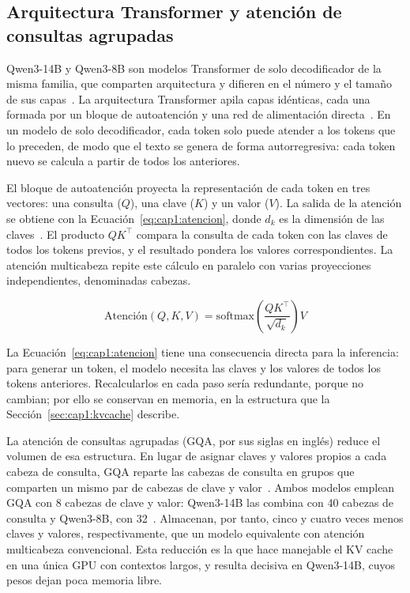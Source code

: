 \subsection{Arquitectura Transformer y atención de consultas agrupadas}
\label{sec:cap1:transformer}

Qwen3-14B y Qwen3-8B son modelos Transformer de solo decodificador de la misma familia, que comparten arquitectura y difieren en el número y el tamaño de sus capas~\cite{qwen2025qwen3}. La arquitectura Transformer apila capas idénticas, cada una formada por un bloque de autoatención y una red de alimentación directa~\cite{vaswani2017attention}. En un modelo de solo decodificador, cada token solo puede atender a los tokens que lo preceden, de modo que el texto se genera de forma autorregresiva: cada token nuevo se calcula a partir de todos los anteriores.

El bloque de autoatención proyecta la representación de cada token en tres vectores: una consulta ($Q$), una clave ($K$) y un valor ($V$). La salida de la atención se obtiene con la Ecuación~\ref{eq:cap1:atencion}, donde $d_k$ es la dimensión de las claves~\cite{vaswani2017attention}. El producto $QK^{\top}$ compara la consulta de cada token con las claves de todos los tokens previos, y el resultado pondera los valores correspondientes. La atención multicabeza repite este cálculo en paralelo con varias proyecciones independientes, denominadas cabezas.

\begin{equation}
\label{eq:cap1:atencion}
\mbox{Atención}(Q, K, V) = \mathrm{softmax}\!\left(\frac{QK^{\top}}{\sqrt{d_k}}\right) V
\end{equation}

La Ecuación~\ref{eq:cap1:atencion} tiene una consecuencia directa para la inferencia: para generar un token, el modelo necesita las claves y los valores de todos los tokens anteriores. Recalcularlos en cada paso sería redundante, porque no cambian; por ello se conservan en memoria, en la estructura que la Sección~\ref{sec:cap1:kvcache} describe.

La atención de consultas agrupadas (GQA, por sus siglas en inglés) reduce el volumen de esa estructura. En lugar de asignar claves y valores propios a cada cabeza de consulta, GQA reparte las cabezas de consulta en grupos que comparten un mismo par de cabezas de clave y valor~\cite{ainslie2023gqa}. Ambos modelos emplean GQA con 8 cabezas de clave y valor: Qwen3-14B las combina con 40 cabezas de consulta y Qwen3-8B, con 32~\cite{qwen2025qwen3}. Almacenan, por tanto, cinco y cuatro veces menos claves y valores, respectivamente, que un modelo equivalente con atención multicabeza convencional. Esta reducción es la que hace manejable el KV cache en una única GPU con contextos largos, y resulta decisiva en Qwen3-14B, cuyos pesos dejan poca memoria libre.

